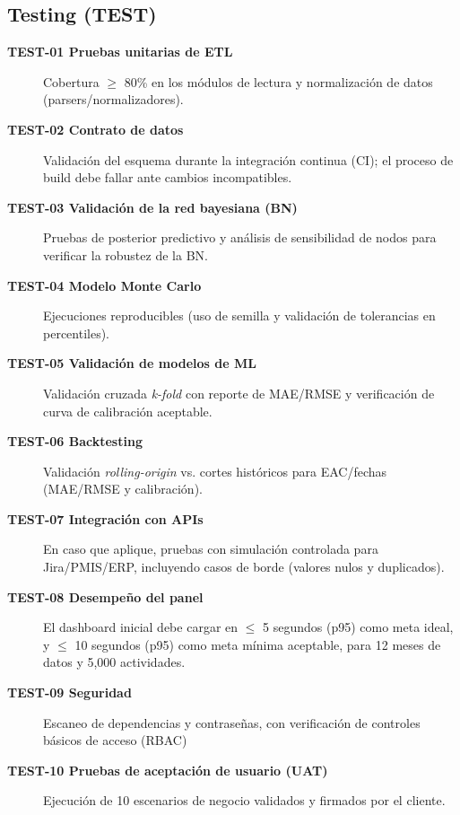 \documentclass[12pt]
{charter}
\begin{document}

\subsection{Testing (TEST)}
\begin{description}
  \item[\textbf{TEST-01 Pruebas unitarias de ETL}] Cobertura $\geq$ 80\% en los módulos de lectura y normalización de datos (parsers/normalizadores).

  \item[\textbf{TEST-02 Contrato de datos}] Validación del esquema durante la integración continua (CI); el proceso de build debe fallar ante cambios incompatibles.

  \item[\textbf{TEST-03 Validación de la red bayesiana (BN)}] Pruebas de posterior predictivo y análisis de sensibilidad de nodos para verificar la robustez de la BN.

  \item[\textbf{TEST-04 Modelo Monte Carlo}] Ejecuciones reproducibles (uso de semilla y validación de tolerancias en percentiles).

  \item[\textbf{TEST-05 Validación de modelos de ML}] Validación cruzada \textit{k-fold} con reporte de MAE/RMSE y verificación de curva de calibración aceptable.

  \item[\textbf{TEST-06 Backtesting}] Validación \textit{rolling-origin} vs. cortes históricos para EAC/fechas (MAE/RMSE y calibración).

  \item[\textbf{TEST-07 Integración con APIs}] En caso que aplique, pruebas con simulación controlada para Jira/PMIS/ERP, incluyendo casos de borde (valores nulos y duplicados).

  \item[\textbf{TEST-08 Desempeño del panel}] El dashboard inicial debe cargar en $\leq$ 5 segundos (p95) como meta ideal, y $\leq$ 10 segundos (p95) como meta mínima aceptable, para 12 meses de datos y 5,000 actividades.

  \item[\textbf{TEST-09 Seguridad}] Escaneo de dependencias y contraseñas, con verificación de controles básicos de acceso (RBAC)

  \item[\textbf{TEST-10 Pruebas de aceptación de usuario (UAT)}] Ejecución de 10 escenarios de negocio validados y firmados por el cliente.

\end{description}
\end{document}
